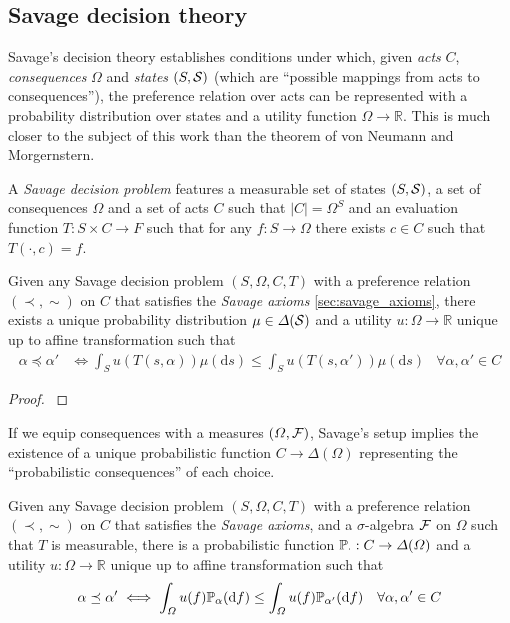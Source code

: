 \subsection{Savage decision theory}

Savage's decision theory establishes conditions under which, given \emph{acts} $C$, \emph{consequences} $\Omega$ and \emph{states} $(S,\mathcal{S})$ (which are ``possible mappings from acts to consequences''), the preference relation over acts can be represented with a probability distribution over states and a utility function $\Omega\to \mathbb{R}$. This is much closer to the subject of this work than the theorem of von Neumann and Morgernstern.

\begin{definition}
A \emph{Savage decision problem} features a measurable set of states $(S,\mathcal{S})$, a set of consequences $\Omega$ and a set of acts $C$ such that $|C|=\Omega^S$ and an evaluation function $T:S\times C\to F$ such that for any $f:S\to \Omega$ there exists $c\in C$ such that $T(\cdot,c)=f$.
\end{definition}

\begin{theorem}
Given any Savage decision problem $(S,\Omega,C,T)$ with a preference relation $(\prec,\sim)$ on $C$ that satisfies the \emph{Savage axioms} \ref{sec:savage_axioms}, there exists a unique probability distribution $\mu\in\Delta(\mathcal{S})$ and a utility $u:\Omega\to \mathbb{R}$ unique up to affine transformation such that
\begin{align}
    \alpha\preceq \alpha' &\iff \int_S u(T(s,\alpha))\mu(\mathrm{d}s) \leq \int_S u(T(s,\alpha'))\mu(\mathrm{d}s)&\forall \alpha,\alpha'\in C
\end{align}
\end{theorem}

\begin{proof}
\citet{savage_foundations_1954}
\end{proof}

If we equip consequences with a measures $(\Omega,\mathcal{F})$, Savage's setup implies the existence of a unique probabilistic function $C\to \Delta(\Omega)$ representing the ``probabilistic consequences'' of each choice.

\begin{theorem}
Given any Savage decision problem $(S,\Omega,C,T)$ with a preference relation $(\prec,\sim)$ on $C$ that satisfies the \emph{Savage axioms}, and a $\sigma$-algebra $\mathcal{F}$ on $\Omega$ such that $T$ is measurable, there is a probabilistic function $\mathbb{P}_{\cdot}:C\to \Delta(\Omega)$ and a utility $u:\Omega\to \mathbb{R}$ unique up to affine transformation such that
\begin{align}
    \alpha\preceq \alpha' &\iff \int_\Omega u(f)\mathbb{P}_\alpha(\mathrm{d}f) \leq \int_\Omega u(f)\mathbb{P}_{\alpha'}(\mathrm{d}f)&\forall \alpha,\alpha'\in C
\end{align}
\end{theorem}

